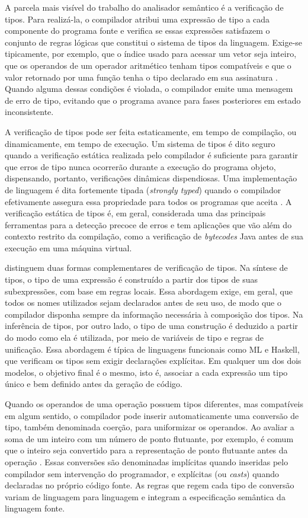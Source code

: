 \documentclass[
    12pt
    ,oneside
    ,a4paper
    ,chapter=TITLE
    ,section=TITLE
    ,sumario=abnt-6027-2012]{abntex2}
\begin{document}
A parcela mais visível do trabalho do analisador semântico é a verificação de tipos.
Para realizá-la, o compilador atribui uma expressão de tipo a cada componente do programa fonte
e verifica se essas expressões satisfazem o conjunto de regras lógicas que constitui o
sistema de tipos da linguagem. Exige-se tipicamente, por exemplo, que o índice usado
para acessar um vetor seja inteiro, que os operandos de um operador aritmético tenham tipos
compatíveis e que o valor retornado por uma função tenha o tipo declarado em sua assinatura
\cite{aho2008}. Quando alguma dessas condições é violada, o compilador emite uma mensagem de
erro de tipo, evitando que o programa avance para fases posteriores em estado inconsistente.

A verificação de tipos pode ser feita estaticamente, em tempo de compilação, ou dinamicamente,
em tempo de execução. Um sistema de tipos é dito seguro quando a verificação estática
realizada pelo compilador é suficiente para garantir que erros de tipo nunca ocorrerão durante
a execução do programa objeto, dispensando, portanto, verificações dinâmicas dispendiosas. Uma
implementação de linguagem é dita fortemente tipada (\textit{strongly typed}) quando o
compilador efetivamente assegura essa propriedade para todos os programas que aceita
\cite{aho2008}. A verificação estática de tipos é, em geral, considerada uma das principais
ferramentas para a detecção precoce de erros e tem aplicações que vão além do contexto restrito
da compilação, como a verificação de \textit{bytecodes} Java antes de sua execução em uma
máquina virtual.

 distinguem duas formas complementares de verificação de tipos. Na
síntese de tipos, o tipo de uma expressão é construído a partir dos tipos de suas
subexpressões, com base em regras locais. Essa abordagem exige, em geral, que todos os nomes
utilizados sejam declarados antes de seu uso, de modo que o compilador disponha sempre da
informação necessária à composição dos tipos. Na inferência de tipos, por outro lado,
o tipo de uma construção é deduzido a partir do modo como ela é utilizada, por meio de
variáveis de tipo e regras de unificação. Essa abordagem é típica de linguagens funcionais
como ML e Haskell, que verificam os tipos sem exigir declarações explícitas. Em qualquer um dos
dois modelos, o objetivo final é o mesmo, isto é, associar a cada expressão um tipo único e
bem definido antes da geração de código.

Quando os operandos de uma operação possuem tipos diferentes, mas compatíveis em algum
sentido, o compilador pode inserir automaticamente uma conversão de tipo, também
denominada coerção, para uniformizar os operandos. Ao avaliar a soma de um inteiro
com um número de ponto flutuante, por exemplo, é comum que o inteiro seja convertido para a
representação de ponto flutuante antes da operação \cite{aho2008}. Essas conversões são
denominadas implícitas quando inseridas pelo compilador sem intervenção do programador, e
explícitas (ou \textit{casts}) quando declaradas no próprio código fonte. As regras que regem
cada tipo de conversão variam de linguagem para linguagem e integram a especificação semântica
da linguagem fonte.
\end{document}
